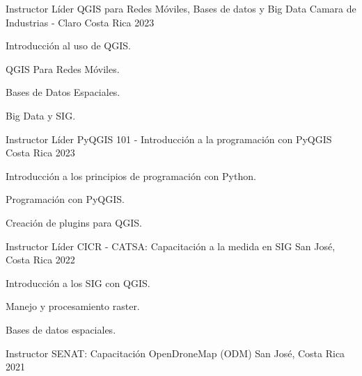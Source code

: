 

\begin{cventries}
 \cventry
 {Instructor Líder} %
 {QGIS para Redes Móviles, Bases de datos y Big Data} %
 {Camara de Industrias - Claro Costa Rica} %
 {2023} %
 {
   \begin{cvitems} %
     \item Introducción al uso de QGIS.
     \item QGIS Para Redes Móviles.
     \item Bases de Datos Espaciales.
     \item Big Data y SIG.
   \end{cvitems}
 }
 \cventry
  {Instructor Líder} %
  {PyQGIS 101 - Introducción a la programación con PyQGIS} %
  {Costa Rica} %
  {2023} %
  {
    \begin{cvitems} %
      \item Introducción a los principios de programación con Python.
      \item Programación con PyQGIS.
      \item Creación de plugins para QGIS.
    \end{cvitems}
  }
 \cventry
  {Instructor Líder} %
  {CICR - CATSA: Capacitación a la medida en SIG} %
  {San José, Costa Rica} %
  {2022} %
  {
    \begin{cvitems} %
      \item Introducción a los SIG con QGIS.
      \item Manejo y procesamiento raster.
      \item Bases de datos espaciales.
    \end{cvitems}
  }
  \cventry
  {Instructor} %
  {SENAT: Capacitación OpenDroneMap (ODM)} %
  {San José, Costa Rica} %
  {2021} %
  {
    \begin{cvitems} %

\end{cvitems}}
\end{cventries}
